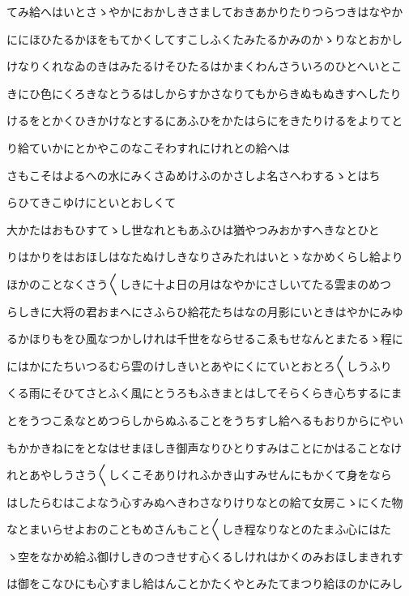 \documentclass[a4paper,11pt,landscape]{ltjtarticle}
\begin{document}
てみ給へはいとさゝやかにおかしきさましておきあかりたりつらつきはなやか
\par\medskip
ににほひたるかほをもてかくしてすこしふくたみたるかみのかゝりなとおかし
\par\medskip
けなりくれなゐのきはみたるけそひたるはかまくわんさういろのひとへいとこ
\par\medskip
きにひ色にくろきなとうるはしからすかさなりてもからきぬもぬきすへしたり
\par\medskip
けるをとかくひきかけなとするにあふひをかたはらにをきたりけるをよりてと
\par\medskip
り給ていかにとかやこのなこそわすれにけれとの給へは
\par\medskip
さもこそはよるへの水にみくさゐめけふのかさしよ名さへわするゝとはち
\par\medskip
らひてきこゆけにといとおしくて
\par\medskip
大かたはおもひすてゝし世なれともあふひは猶やつみおかすへきなとひと
\par\medskip
りはかりをはおほしはなたぬけしきなりさみたれはいとゝなかめくらし給より
\par\medskip
ほかのことなくさう〱しきに十よ日の月はなやかにさしいてたる雲まのめつ
\par\medskip
らしきに大将の君おまへにさふらひ給花たちはなの月影にいときはやかにみゆ
\par\medskip
るかほりもをひ風なつかしけれは千世をならせるこゑもせなんとまたるゝ程に
\par\medskip
にはかにたちいつるむら雲のけしきいとあやにくにていとおとろ〱しうふり
\par\medskip
くる雨にそひてさとふく風にとうろもふきまとはしてそらくらき心ちするにま
\par\medskip
とをうつこゑなとめつらしからぬふることをうちすし給へるもおりからにやい
\par\medskip
もかかきねにをとなはせまほしき御声なりひとりすみはことにかはることなけ
\par\medskip
れとあやしうさう〱しくこそありけれふかき山すみせんにもかくて身をなら
\par\medskip
はしたらむはこよなう心すみぬへきわさなりけりなとの給て女房こゝにくた物
\par\medskip
なとまいらせよおのこともめさんもこと〱しき程なりなとのたまふ心にはた
\par\medskip
ゝ空をなかめ給ふ御けしきのつきせす心くるしけれはかくのみおほしまきれす
\par\medskip
は御をこなひにも心すまし給はんことかたくやとみたてまつり給ほのかにみし
\par\medskip
\end{document}
